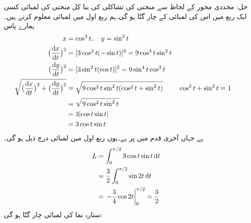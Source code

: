 حل:\quad
محددی محور کے لحاظ سے منحنی کی تشاکلی کی بنا کل منحنی کی لمبائی کسی ایک ربع میں اس کی لمبائی کے چار گنّا ہو گی۔ہم  ربع اول میں لمبائی معلوم کرتے ہیں۔ہمارے پاس
\begin{align*}
x&=\cos^3t,\quad y=\sin^3t\\
\big(\frac{\dif x}{\dif t}\big)^2&=[3\cos^2t(-\sin t)]^2=9\cos^4t\sin^2t\\
\big(\frac{\dif y}{\dif t}\big)^2&=[3\sin^2t(\cos t)]^2=9\sin^4t\cos^2t\\
\sqrt{\big(\frac{\dif x}{\dif t}\big)^2+\big(\frac{\dif y}{\dif t}\big)^2}&=\sqrt{9\cos^2t\sin^2t(\cos^2t+\sin^2t)}&&\cos^2t+\sin^2t=1\\
&=\sqrt{9\cos^2t\sin^2t}\\
&=3\abs{\cos t\sin t}\\
&=3\cos t\sin t&
\end{align*} 
ہے جہاں آخری قدم میں  پر  ہے۔یوں ربع اول میں لمبائی درج ذیل ہو گی۔
\begin{align*}
L&=\int_{0}^{\pi/2}3\cos t\sin t\dif t\\
&=\frac{3}{2}\int_0^{\pi/2}\sin 2t\dif t\\
&=\left.-\frac{3}{4}\cos 2t\right\vert_{0}^{\pi/2}=\frac{3}{2}
\end{align*}
ستارہ نما کی لمبائی چار گنّا ہو گی: 
